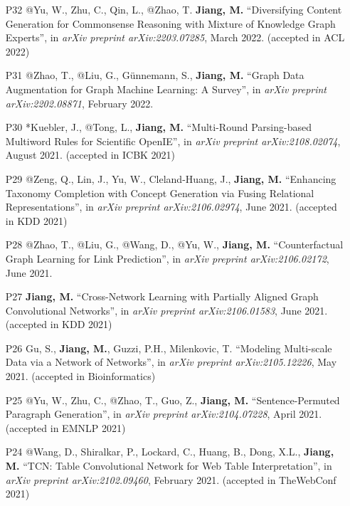 \documentclass[10pt]{article}
\newenvironment{myindentpar}[1]%
{\begin{list}{}%
         {\setlength{\leftmargin}{#1}}%
         \item[]%
}
{\end{list}}
\newcounter{list}
\begin{document}
\begin{myindentpar}{0.00cm}
{\begin{enumerate}[leftmargin=.5cm]
\item[P32] @Yu, W., Zhu, C., Qin, L., @Zhao, T. \textbf{Jiang, M.} ``Diversifying Content Generation for Commonsense Reasoning with Mixture of Knowledge Graph Experts'', in \textit{arXiv preprint arXiv:2203.07285}, March 2022. (accepted in ACL 2022)

\item[P31] @Zhao, T., @Liu, G., Günnemann, S., \textbf{Jiang, M.} ``Graph Data Augmentation for Graph Machine Learning: A Survey'', in \textit{arXiv preprint arXiv:2202.08871}, February 2022.
		
\item[P30] *Kuebler, J., @Tong, L., \textbf{Jiang, M.} ``Multi-Round Parsing-based Multiword Rules for Scientific OpenIE'', in \textit{arXiv preprint arXiv:2108.02074}, August 2021. (accepted in ICBK 2021)

\item[P29] @Zeng, Q., Lin, J., Yu, W., Cleland-Huang, J., \textbf{Jiang, M.} ``Enhancing Taxonomy Completion with Concept Generation via Fusing Relational Representations'', in \textit{arXiv preprint arXiv:2106.02974}, June 2021. (accepted in KDD 2021)

\item[P28] @Zhao, T., @Liu, G., @Wang, D., @Yu, W., \textbf{Jiang, M.} ``Counterfactual Graph Learning for Link Prediction'', in \textit{arXiv preprint arXiv:2106.02172}, June 2021.

\item[P27] \textbf{Jiang, M.} ``Cross-Network Learning with Partially Aligned Graph Convolutional Networks'', in \textit{arXiv preprint arXiv:2106.01583}, June 2021. (accepted in KDD 2021)

\item[P26] Gu, S., \textbf{Jiang, M.}, Guzzi, P.H., Milenkovic, T. ``Modeling Multi-scale Data via a Network of Networks'', in \textit{arXiv preprint arXiv:2105.12226}, May 2021. (accepted in Bioinformatics)

\item[P25] @Yu, W., Zhu, C., @Zhao, T., Guo, Z., \textbf{Jiang, M.} ``Sentence-Permuted Paragraph Generation'', in \textit{arXiv preprint arXiv:2104.07228}, April 2021. (accepted in EMNLP 2021)

\item[P24] @Wang, D., Shiralkar, P., Lockard, C., Huang, B., Dong, X.L., \textbf{Jiang, M.} ``TCN: Table Convolutional Network for Web Table Interpretation'', in \textit{arXiv preprint arXiv:2102.09460}, February 2021. (accepted in TheWebConf 2021)


\end{enumerate}}
\end{myindentpar}
\end{document}
